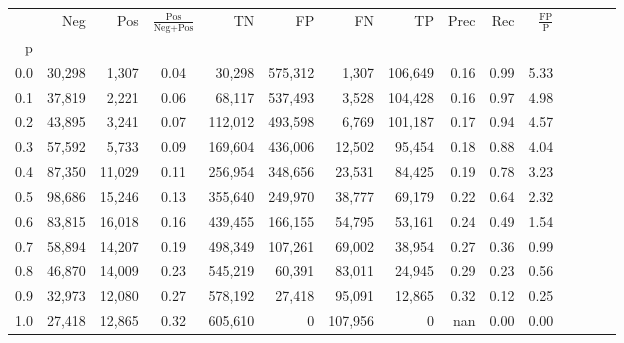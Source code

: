\begin{tabular}{rrrcrrrrrrrrrrr}
\toprule
{} &     Neg &     Pos & $\frac{\text{Pos}}{\text{Neg}+\text{Pos}}$ &       TN &       FP &       FN &       TP &  Prec &   Rec & $\frac{\text{FP}}{\text{P}}$ \\
p   &         &         &                                            &          &          &          &          &       &       &                              \\
\midrule
0.0 &  30,298 &   1,307 &                                       0.04 &   30,298 &  575,312 &    1,307 &  106,649 &  0.16 &  0.99 &                         5.33 \\
0.1 &  37,819 &   2,221 &                                       0.06 &   68,117 &  537,493 &    3,528 &  104,428 &  0.16 &  0.97 &                         4.98 \\
0.2 &  43,895 &   3,241 &                                       0.07 &  112,012 &  493,598 &    6,769 &  101,187 &  0.17 &  0.94 &                         4.57 \\
0.3 &  57,592 &   5,733 &                                       0.09 &  169,604 &  436,006 &   12,502 &   95,454 &  0.18 &  0.88 &                         4.04 \\
0.4 &  87,350 &  11,029 &                                       0.11 &  256,954 &  348,656 &   23,531 &   84,425 &  0.19 &  0.78 &                         3.23 \\
0.5 &  98,686 &  15,246 &                                       0.13 &  355,640 &  249,970 &   38,777 &   69,179 &  0.22 &  0.64 &                         2.32 \\
0.6 &  83,815 &  16,018 &                                       0.16 &  439,455 &  166,155 &   54,795 &   53,161 &  0.24 &  0.49 &                         1.54 \\
0.7 &  58,894 &  14,207 &                                       0.19 &  498,349 &  107,261 &   69,002 &   38,954 &  0.27 &  0.36 &                         0.99 \\
0.8 &  46,870 &  14,009 &                                       0.23 &  545,219 &   60,391 &   83,011 &   24,945 &  0.29 &  0.23 &                         0.56 \\
0.9 &  32,973 &  12,080 &                                       0.27 &  578,192 &   27,418 &   95,091 &   12,865 &  0.32 &  0.12 &                         0.25 \\
1.0 &  27,418 &  12,865 &                                       0.32 &  605,610 &        0 &  107,956 &        0 &   nan &  0.00 &                         0.00 \\
\bottomrule
\end{tabular}

